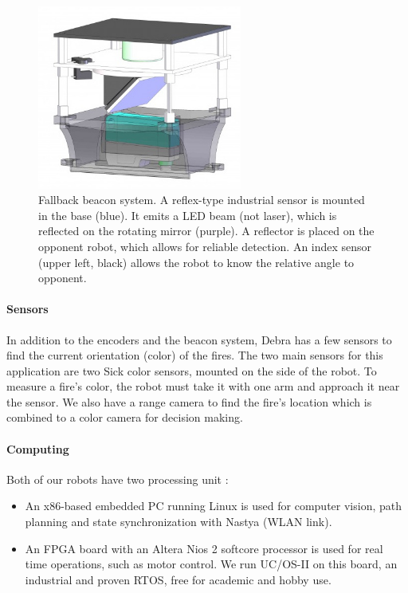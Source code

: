 \documentclass[a4paper]{paper}
\begin{document}
\begin{figure}[h]
    \begin{center}
        \includegraphics[width=0.6\textwidth]{images/Balise}
        \caption{Fallback beacon system.
            A reflex-type industrial sensor is mounted in the base (blue).
            It emits a LED beam (not laser), which is reflected on the rotating mirror (purple).
            A reflector is placed on the opponent robot, which allows for reliable detection.
            An index sensor (upper left, black) allows the robot to know the relative angle to opponent.
        }
        \label{fig:balise}
    \end{center}
\end{figure}



\paragraph{Sensors}
In addition to the encoders and the beacon system, Debra has a few sensors to find the current orientation (color) of the fires.
The two main sensors for this application are two Sick color sensors, mounted on the side of the robot.
To measure a fire's color, the robot must take it with one arm and approach it near the sensor.
We also have a range camera to find the fire's location which is combined to a color camera for decision making.

\paragraph{Computing}
Both of our robots have two processing unit :
\begin{itemize}
    \item An x86-based embedded PC running Linux is used for computer vision, path planning and state synchronization with Nastya (WLAN link).
    \item An FPGA board with an Altera Nios 2 softcore processor is used for real time operations, such as motor control.
        We run UC/OS-II on this board, an industrial and proven RTOS, free for academic and hobby use.
\end{itemize}
\end{document}
